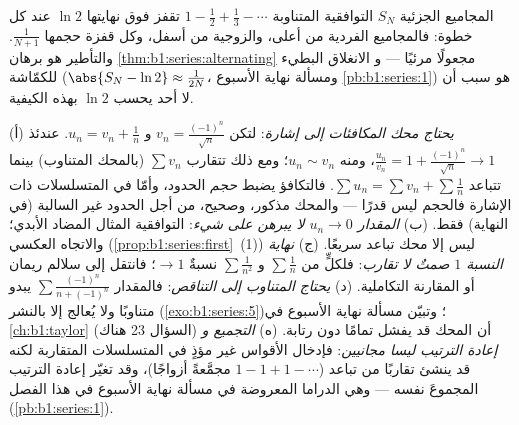 \begin{omfigure}

{\small المجاميع الجزئية $S_N$  التوافقية
المتناوبة $1 - \frac12 + \frac13 - \cdots$ تقفز فوق نهايتها
$\ln 2$ عند كل خطوة: فالمجاميع الفردية من أعلى، والزوجية من
أسفل، وكل قفزة حجمها $\frac{1}{N+1}$. والتأطير هو
برهان \cref{thm:b1:series:alternating} مجعولًا مرئيًا --- و
الانغلاق البطيء للكمّاشة ($\abs{S_N - \ln 2} \approx
\frac{1}{2N}$، ومسألة نهاية الأسبوع \cref{pb:b1:series:1}) هو سبب أن
لا أحد يحسب $\ln 2$ بهذه الكيفية.}
\end{omfigure}

\begin{remark}
(أ) \emph{يحتاج محك المكافئات إلى إشارة}: لتكن $v_n =
\frac{(-1)^n}{\sqrt n}$ و $u_n = v_n + \frac1n$. عندئذ
$\frac{u_n}{v_n} = 1 + \frac{(-1)^n}{\sqrt n} \to 1$، ومنه $u_n
\sim v_n$؛ ومع ذلك تتقارب $\sum v_n$ (بالمحك المتناوب) بينما
تتباعد $\sum u_n = \sum v_n + \sum \frac1n$. فالتكافؤ
يضبط \emph{حجم} الحدود، وأمّا في المتسلسلات ذات الإشارة فالحجم
ليس قدرًا --- والمحك مذكور، وصحيح، من أجل الحدود
غير السالبة (في النهاية) فقط. (ب) \emph{المقدار $u_n \to 0$
لا يبرهن على شيء}:  التوافقية المثال المضاد
الأبدي؛ والاتجاه العكسي
(\cref{prop:b1:series:first}~(1)) ليس إلا محك تباعد
سريعًا. (ج) \emph{نهاية النسبة $1$ صمتٌ لا
تقارب}: فلكلٍّ من $\sum\frac1n$ و $\sum\frac{1}{n^2}$
نسبةٌ $\to 1$؛ فانتقل إلى سلالم ريمان أو المقارنة التكاملية.
(د) \emph{يحتاج المتناوب إلى التناقص}: فالمقدار $\sum
\frac{(-1)^n}{n + (-1)^n}$ يبدو متناوبًا ولا يُعالج
إلا بالنشر (\cref{exo:b1:series:5})؛ وتبيّن مسألة نهاية الأسبوع
في \cref{ch:b1:taylor} (السؤال 23 هناك) أن المحك قد
يفشل تمامًا دون رتابة. (ه) \emph{التجميع و
إعادة الترتيب ليسا مجانيين}: فإدخال الأقواس غير مؤذٍ في
المتسلسلات المتقاربة لكنه قد ينشئ تقاربًا من تباعد
($1 - 1 + 1 - \cdots$ مجمَّعةً أزواجًا)، وقد تغيّر إعادة الترتيب
المجموعَ نفسه --- وهي الدراما المعروضة في مسألة نهاية الأسبوع
في هذا الفصل (\cref{pb:b1:series:1}).
\end{remark}

